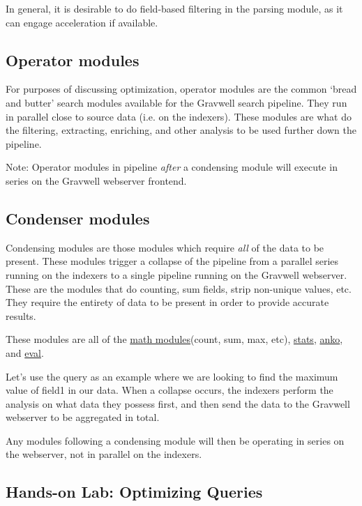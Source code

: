 In general, it is desirable to do field-based filtering in the parsing
module, as it can engage acceleration if available.

\subsection{Operator modules}

For purposes of discussing optimization, operator modules are the
common `bread and butter' search modules available for the Gravwell
search pipeline. They run in parallel close to source data (i.e. on
the indexers). These modules are what do the filtering, extracting,
enriching, and other analysis to be used further down the pipeline.

Note: Operator modules in pipeline \emph{after} a condensing module will
execute in series on the Gravwell webserver frontend.

\subsection{Condenser modules}

Condensing modules are those modules which require \emph{all} of the data to
be present. These modules trigger a collapse of the pipeline from a
parallel series running on the indexers to a single pipeline running on
the Gravwell webserver. These are the modules that do counting, sum
fields, strip non-unique values, etc. They require the entirety of data
to be present in order to provide accurate results.

These modules are all of the \href{https://docs.gravwell.io/\#!search/math/math.md}{math
modules}(count, sum, max, etc),
\href{https://docs.gravwell.io/\#!search/stats/stats.md}{stats},
\href{https://docs.gravwell.io/\#!search/anko/anko.md}{anko}, and
\href{https://docs.gravwell.io/\#!search/eval/eval.md}{eval}.

Let's use the query  as an
example where we are looking to find the maximum value of field1 in our
data. When a collapse occurs, the indexers perform the analysis on what
data they possess first, and then send the data to the Gravwell
webserver to be aggregated in total.

Any modules following a condensing module will then be operating in
series on the webserver, not in parallel on the indexers.

\clearpage
\subsection{Hands-on Lab: Optimizing Queries}

